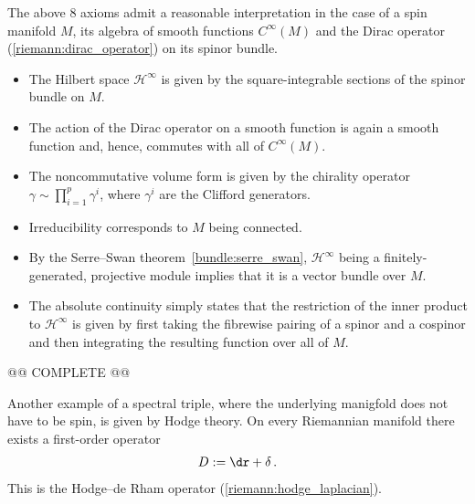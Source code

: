     \begin{example}
        The above 8 axioms admit a reasonable interpretation in the case of a spin manifold $M$, its algebra of smooth functions $C^\infty(M)$ and the Dirac operator (\cref{riemann:dirac_operator}) on its spinor bundle.
        \begin{itemize}
            \item The Hilbert space $\mathcal{H}^\infty$ is given by the square-integrable sections of the spinor bundle on $M$.
            \item The action of the Dirac operator on a smooth function is again a smooth function and, hence, commutes with all of $C^\infty(M)$.
            \item The noncommutative volume form is given by the chirality operator $\gamma\sim\prod_{i=1}^p\gamma^i$, where $\gamma^i$ are the Clifford generators.
            \item Irreducibility corresponds to $M$ being connected.
            \item By the Serre--Swan theorem~\ref{bundle:serre_swan}, $\mathcal{H}^\infty$ being a finitely-generated, projective module implies that it is a vector bundle over $M$.
            \item The absolute continuity simply states that the restriction of the inner product to $\mathcal{H}^\infty$ is given by first taking the fibrewise pairing of a spinor and a cospinor and then integrating the resulting function over all of $M$.
        \end{itemize}
        @@ COMPLETE @@
    \end{example}
    \begin{example}
        Another example of a spectral triple, where the underlying manigfold does not have to be spin, is given by Hodge theory. On every Riemannian manifold there exists a first-order operator
        \begin{gather}
            D:=\dr+\delta\,.
        \end{gather}
        This is the Hodge--de Rham operator (\cref{riemann:hodge_laplacian}).
    \end{example}

